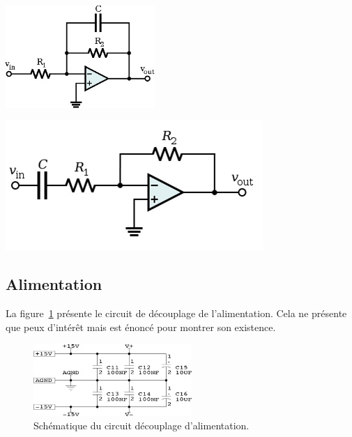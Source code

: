 \documentclass[10pt, oneside, a4paper]{article}
\begin{document}
\begin{minipage}[t]{.45\textwidth}
    \centering
    \includegraphics[height=110pt]{eps/active-lowpass-filter-rc.eps}
    \label{fig:filtreLowpass}
\end{minipage} \hfill
\begin{minipage}[t]{.45\textwidth}
    \centering
    \includegraphics[width=\textwidth]{image/active-highpass-filter-rc.png}
    \label{fig:filtreHighpass}
\end{minipage}

\subsection{Alimentation}
La figure~\ref{fig:alimDecouplage} présente le circuit de découplage de l'alimentation.
Cela ne présente que peux d'intérêt mais est énoncé pour montrer son existence.

\begin{figure}[!ht]
	\centering
	\includegraphics[width=6cm]{image/sch-alim.png}
	\caption{Schématique du circuit découplage d'alimentation.}
	\label{fig:alimDecouplage}
\end{figure}
\end{document}
